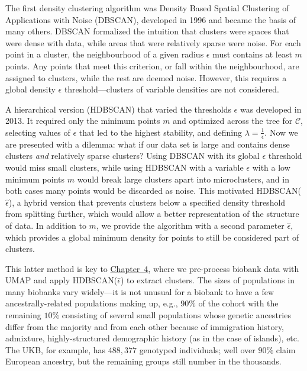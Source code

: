 The first density clustering algorithm was Density Based Spatial Clustering of Applications with Noise (DBSCAN), developed in 1996\citep{ester1996density} and became the basis of many others\citep{khan_dbscan_2014}. DBSCAN formalized the intuition that clusters were spaces that were dense with data, while areas that were relatively sparse were noise. For each point in a cluster, the neighbourhood of a given radius $\epsilon$ must contains at least $m$ points. Any points that meet this criterion, or fall within the neighbourhood, are assigned to clusters, while the rest are deemed noise. However, this requires a global density $\epsilon$ threshold---clusters of variable densities are not considered. 

A hierarchical version (HDBSCAN) that varied the thresholds $\epsilon$ was developed in 2013\citep{campello_density-based_2013}. It required only the minimum points $m$ and optimized across the tree for $\mathcal{C}$, selecting values of $\epsilon$ that led to the highest stability, and defining $\lambda = \frac{1}{\epsilon}$. Now we are presented with a dilemma: what if our data set is large and contains dense clusters \emph{and} relatively sparse clusters? Using DBSCAN with its global $\epsilon$ threshold would miss small clusters, while using HDBSCAN with a variable $\epsilon$ with a low minimum points $m$ would break large clusters apart into microclusters, and in both cases many points would be discarded as noise. This motivated HDBSCAN($\hat{\epsilon}$), a hybrid version that prevents clusters below a specified density threshold from splitting further, which would allow a better representation of the structure of data\citep{malzer_hybrid_2020}. In addition to $m$, we provide the algorithm with a second parameter $\hat{\epsilon}$, which provides a global minimum density for points to still be considered part of clusters.

This latter method is key to \hyperref[chap:chapter4]{Chapter~4}, where we pre-process biobank data with UMAP and apply HDBSCAN($\hat{\epsilon}$) to extract clusters. The sizes of populations in many biobanks vary widely---it is not unusual for a biobank to have a few ancestrally-related populations making up, e.g., $90\%$ of the cohort with the remaining $10\%$ consisting of several small populations whose genetic ancestries differ from the majority and from each other because of immigration history, admixture, highly-structured demographic history (as in the case of islands), etc. The UKB, for example, has $488,377$ genotyped individuals; well over $90\%$ claim European ancestry, but the remaining groups still number in the thousands.

